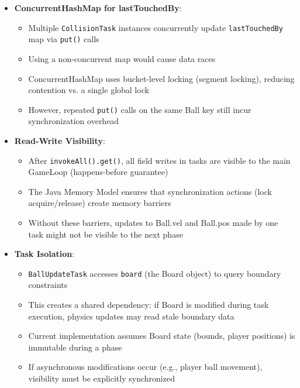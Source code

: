 \documentclass[12pt,a4paper]{article}
\begin{document}
\begin{itemize}
    
    \item \textbf{ConcurrentHashMap for lastTouchedBy}:
    \begin{itemize}
        \item Multiple \texttt{CollisionTask} instances concurrently update \texttt{lastTouchedBy} map via \texttt{put()} calls
        \item Using a non-concurrent map would cause data races
        \item ConcurrentHashMap uses bucket-level locking (segment locking), reducing contention vs. a single global lock
        \item However, repeated \texttt{put()} calls on the same Ball key still incur synchronization overhead
    \end{itemize}
    
    \item \textbf{Read-Write Visibility}:
    \begin{itemize}
        \item After \texttt{invokeAll().get()}, all field writes in tasks are visible to the main GameLoop (happens-before guarantee)
        \item The Java Memory Model ensures that synchronization actions (lock acquire/release) create memory barriers
        \item Without these barriers, updates to Ball.vel and Ball.pos made by one task might not be visible to the next phase
    \end{itemize}
    
    \item \textbf{Task Isolation}:
    \begin{itemize}
        \item \texttt{BallUpdateTask} accesses \texttt{board} (the Board object) to query boundary constraints
        \item This creates a shared dependency: if Board is modified during task execution, physics updates may read stale boundary data
        \item Current implementation assumes Board state (bounds, player positions) is immutable during a phase
        \item If asynchronous modifications occur (e.g., player ball movement), visibility must be explicitly synchronized
    \end{itemize}
    

\end{itemize}
\end{document}
